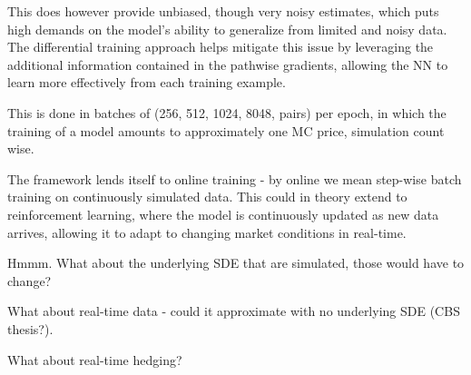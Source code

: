 This does however provide unbiased, though very noisy estimates, which puts high demands on the model's ability to generalize from limited and noisy data. The differential training approach helps mitigate this issue by leveraging the additional information contained in the pathwise gradients, allowing the NN to learn more effectively from each training example. 

This is done in batches of (256, 512, 1024, 8048, pairs) per epoch, in which the training of a model amounts to approximately one MC price, simulation count wise.

The framework lends itself to online training - by online we mean step-wise batch training on continuously simulated data. This could in theory extend to reinforcement learning, where the model is continuously updated as new data arrives, allowing it to adapt to changing market conditions in real-time. 

Hmmm. What about the underlying SDE that are simulated, those would have to change? 

What about real-time data - could it approximate with no underlying SDE (CBS thesis?).

What about real-time hedging? 